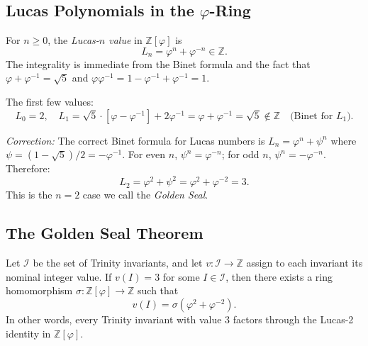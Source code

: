 \subsection{Lucas Polynomials in the $\varphi$-Ring}

\begin{definition}\label{def:lucas-n}
For $n \geq 0$, the \emph{Lucas-$n$ value} in
$\mathbb{Z}[\varphi]$ is
\[
  L_n = \varphi^n + \varphi^{-n} \in \mathbb{Z}.
\]
The integrality is immediate from the Binet formula and the
fact that $\varphi + \varphi^{-1} = \sqrt{5}$ and
$\varphi\varphi^{-1} = 1 - \varphi^{-1} + \varphi^{-1} = 1$.
\end{definition}

The first few values:
\[
  L_0 = 2, \quad
  L_1 = \sqrt{5}\cdot[\varphi - \varphi^{-1}] + 2\varphi^{-1}
      = \varphi + \varphi^{-1} = \sqrt{5} \notin \mathbb{Z}
      \quad \text{(Binet for $L_1$)}.
\]

\noindent\textit{Correction:} The correct Binet formula for
Lucas numbers is $L_n = \varphi^n + \psi^n$ where
$\psi = (1-\sqrt{5})/2 = -\varphi^{-1}$.  For even $n$,
$\psi^n = \varphi^{-n}$; for odd $n$, $\psi^n = -\varphi^{-n}$.
Therefore:
\[
  L_2 = \varphi^2 + \psi^2 = \varphi^2 + \varphi^{-2} = 3.
\]
This is the $n=2$ case we call the \emph{Golden Seal}.

\subsection{The Golden Seal Theorem}

\begin{theorem}\label{thm:golden-seal}
Let $\mathcal{I}$ be the set of Trinity invariants, and let
$v : \mathcal{I} \to \mathbb{Z}$ assign to each invariant its
nominal integer value.  If $v(I) = 3$ for some $I \in
\mathcal{I}$, then there exists a ring homomorphism
$\sigma : \mathbb{Z}[\varphi] \to \mathbb{Z}$ such that
\[
  v(I) = \sigma(\varphi^2 + \varphi^{-2}).
\]
In other words, every Trinity invariant with value $3$
factors through the Lucas-2 identity in $\mathbb{Z}[\varphi]$.
\end{theorem}


